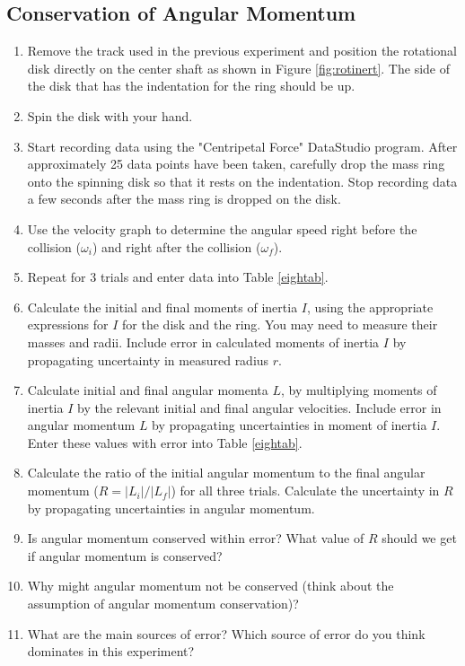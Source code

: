 \subsection{Conservation of Angular Momentum}
\label{diskinert}
\begin{enumerate}
	\item Remove the track used in the previous experiment and position the rotational disk directly on the center shaft as shown in Figure \ref{fig:rotinert}.  The side of the disk that has the indentation for the ring should be up.
	\item Spin the disk with your hand.
	\item Start recording data using the "Centripetal Force" DataStudio program.  After approximately 25 data points have been taken, carefully drop the mass ring onto the spinning disk so that it rests on the indentation. Stop recording data a few seconds after the mass ring is dropped on the disk.
	\item Use the velocity graph to determine the angular speed right before the collision ($\omega _{i}$) and right after the collision ($\omega _{f}$).
	\item Repeat for 3 trials and enter data into Table \ref{eightab}.
	\item Calculate the initial and final moments of inertia $I$, using the appropriate expressions for $I$ for the disk and the ring. You may need to measure their masses and radii. Include error in calculated moments of inertia $I$ by propagating uncertainty in measured radius $r$.
	\item Calculate initial and final angular momenta $L$, by multiplying moments of inertia $I$ by the relevant initial and final angular velocities. Include error in angular momentum $L$ by propagating uncertainties in moment of inertia $I$. Enter these values with error into Table \ref{eightab}.
	\item Calculate the ratio of the initial angular momentum to the final angular momentum ($R = |L_i| /|L_f|$) for all three trials. Calculate the uncertainty in $R$ by propagating uncertainties in angular momentum.
	\item Is angular momentum conserved within error? What value of $R$ should we get if angular momentum is conserved?
	\item Why might angular momentum not be conserved (think about the assumption of angular momentum conservation)?
	\item  What are the main sources of error? Which source of error do you think dominates in this experiment?
\end{enumerate}

